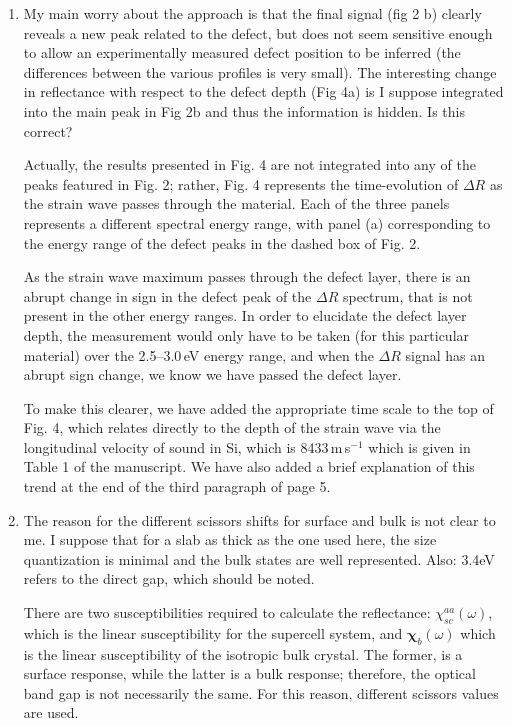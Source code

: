 \documentclass[aps,prb,10pt,endfloats]{revtex4-1}
\begin{document}
\begin{enumerate}

\item My main worry about the approach is that the final signal (fig 2 b) 
clearly reveals a new peak related to the defect, but does not seem sensitive
enough to allow an experimentally measured defect position to be inferred (the
differences between the various profiles is very small). The interesting change
in reflectance with respect to the defect depth (Fig 4a) is I suppose integrated
into the main peak in Fig 2b and thus the information is hidden. Is this
correct?
\begin{shaded*}
Actually, the results presented in Fig. 4 are not integrated into any of the
peaks featured in Fig. 2; rather, Fig. 4 represents the time-evolution of
$\Delta R$ as the strain wave passes through the material. Each of the three
panels represents a different spectral energy range, with panel (a)
corresponding to the energy range of the defect peaks in the dashed box of Fig.
2.

As the strain wave maximum passes through the defect layer, there is an abrupt
change in sign in the defect peak of the $\Delta R$ spectrum, that is not
present in the other energy ranges. In order to elucidate the defect layer
depth, the measurement would only have to be taken (for this particular
material) over the 2.5--3.0\,eV energy range, and when the $\Delta R$ signal has
an abrupt sign change, we know we have passed the defect layer.

To make this clearer, we have added the appropriate time scale to the top of
Fig. 4, which relates directly to the depth of the strain wave via the
longitudinal velocity of sound in Si, which is 8433\,m\,s$^{-1}$ which is given
in Table 1 of the manuscript. We have also added a brief explanation of this
trend at the end of the third paragraph of page 5.
\end{shaded*}

\item The reason for the different scissors shifts for surface and bulk is not
clear to me. I suppose that for a slab as thick as the one used here, the size
quantization is minimal and the bulk states are well represented. Also: 3.4eV
refers to the direct gap, which should be noted.
\begin{shaded*}
There are two susceptibilities required to calculate the reflectance:
$\chi^{aa}_{sc}(\omega)$, which is the linear susceptibility for the supercell
system, and $\boldsymbol{\chi}^{~}_{b}(\omega)$ which is the linear
susceptibility of the isotropic bulk crystal. The former, is a surface response,
while the latter is a bulk response; therefore, the optical band gap is not
necessarily the same. For this reason, different scissors values are used.


\end{shaded*}
\end{enumerate}
\end{document}
